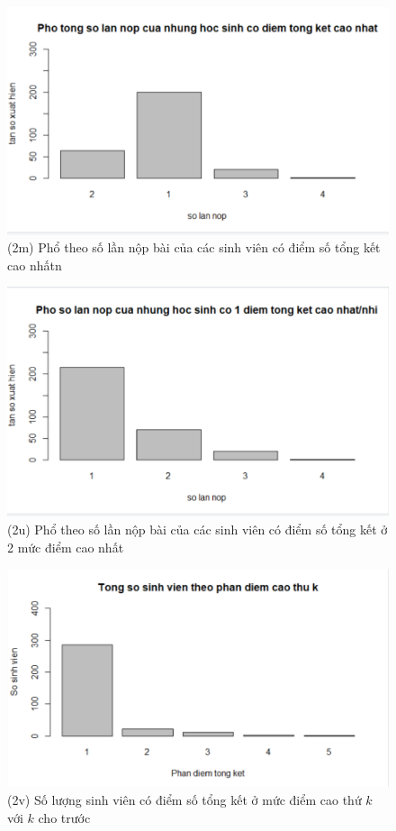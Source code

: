 \documentclass[a4paper]{article}
\theoremstyle{definition}
\begin{document}
\begin{figure}[!ht]
    \centering
    \includegraphics[scale=0.4]{Pics/q2m-file1.PNG}
    \caption{(2m) Phổ theo số lần nộp bài của các sinh viên có điểm số tổng kết cao nhấtn}
    \label{fig:my_label}
\end{figure}
\begin{figure}[!ht]
    \centering
    \includegraphics[scale=0.4]{Pics/q2u-file1.PNG}
    \caption{(2u) Phổ theo số lần nộp bài của các sinh viên có điểm số tổng kết ở 2 mức điểm cao nhất}
    \label{fig:my_label}
\end{figure}
\newpage 
\begin{figure}[!ht]
    \centering
    \includegraphics[scale=0.4]{Pics/q2v-file1.PNG}
    \caption{(2v) Số lượng sinh viên có điểm số tổng kết ở mức điểm cao thứ $k$ với $k$ cho trước}
    \label{fig:my_label}
\end{figure}
\end{document}
